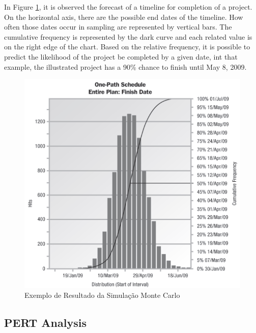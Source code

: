 In Figure \ref{fig:montecarlo}, it is observed the forecast of a timeline for completion of a project. On the horizontal axis, there are the possible end dates of the timeline. How often those dates occur in sampling are represented by vertical bars. The cumulative frequency is represented by the dark curve and each related value is on the right edge of the chart. Based on the relative frequency, it is possible to predict the likelihood of the project be completed by a given date, int that example, the illustrated project has a 90\% chance to finish until May 8, 2009.

\begin{figure}[h]
	\centering
	\includegraphics[width=.6\textwidth]{image/montecarlo.png}
	\caption{Exemplo de Resultado da Simulação Monte Carlo}
	\label{fig:montecarlo}
\end{figure}

\subsection{PERT Analysis}

